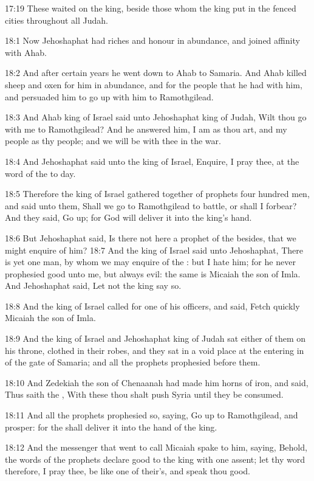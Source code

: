 17:19 These waited on the king, beside those whom the king put in the
fenced cities throughout all Judah.

18:1 Now Jehoshaphat had riches and honour in abundance, and joined
affinity with Ahab.

18:2 And after certain years he went down to Ahab to Samaria. And Ahab
killed sheep and oxen for him in abundance, and for the people that he
had with him, and persuaded him to go up with him to Ramothgilead.

18:3 And Ahab king of Israel said unto Jehoshaphat king of Judah, Wilt
thou go with me to Ramothgilead? And he answered him, I am as thou
art, and my people as thy people; and we will be with thee in the war.

18:4 And Jehoshaphat said unto the king of Israel, Enquire, I pray
thee, at the word of the \LORD to day.

18:5 Therefore the king of Israel gathered together of prophets four
hundred men, and said unto them, Shall we go to Ramothgilead to
battle, or shall I forbear? And they said, Go up; for God will deliver
it into the king's hand.

18:6 But Jehoshaphat said, Is there not here a prophet of the \LORD
besides, that we might enquire of him?  18:7 And the king of Israel
said unto Jehoshaphat, There is yet one man, by whom we may enquire of
the \LORD: but I hate him; for he never prophesied good unto me, but
always evil: the same is Micaiah the son of Imla. And Jehoshaphat
said, Let not the king say so.

18:8 And the king of Israel called for one of his officers, and said,
Fetch quickly Micaiah the son of Imla.

18:9 And the king of Israel and Jehoshaphat king of Judah sat either
of them on his throne, clothed in their robes, and they sat in a void
place at the entering in of the gate of Samaria; and all the prophets
prophesied before them.

18:10 And Zedekiah the son of Chenaanah had made him horns of iron,
and said, Thus saith the \LORD, With these thou shalt push Syria until
they be consumed.

18:11 And all the prophets prophesied so, saying, Go up to
Ramothgilead, and prosper: for the \LORD shall deliver it into the hand
of the king.

18:12 And the messenger that went to call Micaiah spake to him,
saying, Behold, the words of the prophets declare good to the king
with one assent; let thy word therefore, I pray thee, be like one of
their's, and speak thou good.

